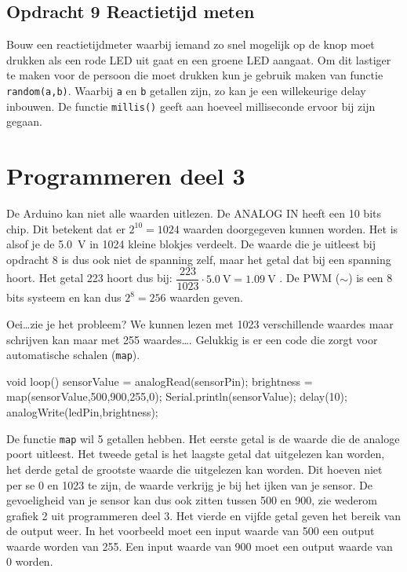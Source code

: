 \documentclass{arduino}
\begin{document}
\subsection{Opdracht 9 Reactietijd meten}

Bouw een reactietijdmeter waarbij iemand zo snel mogelijk op de knop moet drukken als een rode LED uit gaat en een groene LED aangaat. Om dit lastiger te maken voor de persoon die moet drukken kun je gebruik maken van functie \lstinline{random(a,b)}. Waarbij \lstinline{a} en \lstinline{b} getallen zijn, zo kan je een willekeurige delay inbouwen. De functie \lstinline{millis()} geeft aan hoeveel milliseconde ervoor bij zijn gegaan.

\newpage

\section{Programmeren deel 3}


De Arduino kan niet alle waarden uitlezen. De ANALOG IN heeft een 10 bits chip. Dit betekent dat er $2^{10} = 1024$ waarden doorgegeven kunnen worden. Het is alsof je de \SI{5.0}{\volt} in 1024 kleine blokjes verdeelt. De waarde die je  uitleest bij opdracht 8 is dus ook niet de spanning zelf, maar het getal dat bij een spanning hoort. Het getal 223 hoort dus bij: $\dfrac{223}{1023} \cdot \SI{5.0}{\volt} = \SI{1.09}{\volt}$ . De PWM ($\sim$) is een 8 bits systeem en kan dus $2^8 = 256$ waarden geven.

Oei\dots zie je het probleem? We kunnen lezen met 1023 verschillende waardes maar schrijven kan maar met 255 waardes\dots. Gelukkig is er een code die zorgt voor automatische schalen (\lstinline{map}).

\begin{marginlisting}
void loop() {
  sensorValue = analogRead(sensorPin);
  brightness = map(sensorValue,500,900,255,0);
  Serial.println(sensorValue);
  delay(10);
  analogWrite(ledPin,brightness);
}
\end{marginlisting}
De functie \lstinline{map} wil 5 getallen hebben. Het eerste getal is de waarde die de analoge poort uitleest. Het tweede getal is het laagste getal dat uitgelezen kan worden, het derde getal de grootste waarde die uitgelezen kan worden. Dit hoeven niet per se 0 en 1023 te zijn, de waarde verkrijg je bij het ijken van je sensor. De gevoeligheid van je sensor kan dus ook zitten tussen 500 en 900, zie wederom grafiek 2 uit programmeren deel 3. Het vierde en vijfde getal geven het bereik van de output weer. In het voorbeeld moet een input waarde van 500 een output waarde worden van 255. Een input waarde van 900 moet een output waarde van 0 worden.
\end{document}
